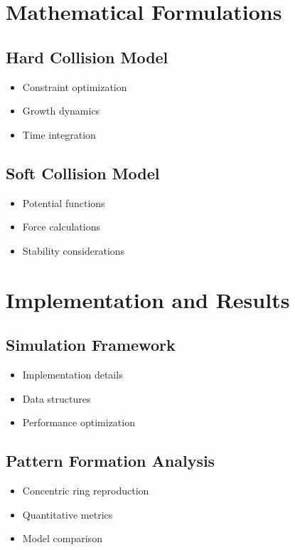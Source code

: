 \documentclass[conference]{IEEEtran}
\begin{document}
\section{Mathematical Formulations}
\subsection{Hard Collision Model}
\begin{itemize}
    \item Constraint optimization
    \item Growth dynamics
    \item Time integration
\end{itemize}

\subsection{Soft Collision Model}
\begin{itemize}
    \item Potential functions
    \item Force calculations
    \item Stability considerations
\end{itemize}

\section{Implementation and Results}
\subsection{Simulation Framework}
\begin{itemize}
    \item Implementation details
    \item Data structures
    \item Performance optimization
\end{itemize}

\subsection{Pattern Formation Analysis}
\begin{itemize}
    \item Concentric ring reproduction
    \item Quantitative metrics
    \item Model comparison
\end{itemize}
\end{document}
